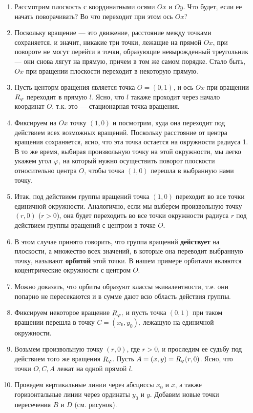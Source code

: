 \begin{enumerate}
\item Рассмотрим плоскость с координатными осями $Ox$ и $Oy$. Что будет, если ее начать поворачивать? Во что переходит при этом ось $Ox$?
\item Поскольку вращение --- это движение, расстояние между точками сохраняется, и значит, никакие три точки, лежащие на прямой $Ox$, при повороте не могут перейти в точки, образующие невырожденный треугольник --- они снова лягут на прямую, причем в том же самом порядке. Стало быть, $Ox$ при вращении плоскости переходит в некоторую прямую.
\item Пусть центорм вращения является точка $O=(0,1)$, и ось $Ox$ при вращении $R_\varphi$ переходит в прямую $l$. Ясно, что $l$ такаже проходит через начало координат $O$, т.к. это --- стационарная точка вращения.
\item Фиксируем на $Ox$ точку $(1,0)$ и посмотрим, куда она переходит под действием всех возможных вращений. Поскольку расстояние от центра вращения сохраняется, ясно, что эта точка остается на окружности радиуса 1. В то же время, выбирая произвольную точку на этой окружности, мы легко укажем угол $\varphi$, на который нужно осуществить поворот плоскости относительно центра $O$, чтобы точка $(1,0)$ перешла в выбранную нами точку.
\item Итак, под действием группы вращений точка $(1,0)$ переходит во все точки единичной окружности. Аналогично, если мы выберем произвольную точку $(r,0)$ ($r>0$), она будет переходить во все точки окружности радиуса $r$ под действием группы вращений с центром в точке $O$.
\item В этом случае принято говорить, что группа вращений \textbf{действует} на плоскости, а множество всех значений, в которые она переводит выбранную точку, называют \textbf{орбитой} этой точки. В нашем примере орбитами являются коцентрические окружности с центром $O$.
\item Можно доказать, что орбиты образуют классы экивалентности, т.е. они попарно не пересекаются и в сумме дают всю область действия группы.
\item Фиксируем некоторое вращение $R_\varphi$, и пусть точка $(0,1)$ при таком вращении перешла в точку $C=(x_0,y_0)$, лежащую на единичной окружности.
\item Возьмем произвольную точку $(r,0)$, где $r>0$, и проследим ее судьбу под действием того же вращения $R_\varphi$. Пусть $A=(x,y)=R_\varphi(r,0)$. Ясно, что точки $O,C,A$ лежат на одной прямой $l$.
\item Проведем вертикальные линии через абсциссы $x_0$ и $x$, а также горизонтальные линии через ординаты $y_0$ и $y$. Добавим новые точки пересечения $B$ и $D$ (см. рисунок).


\end{enumerate}
